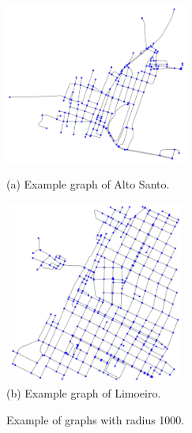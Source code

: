 \documentclass[a4paper,11pt]{article}
\begin{document}
\begin{figure}[!ht]
  \begin{minipage}[c]{.6\textwidth}
    \includegraphics[width=6cm, height=6cm]{graph-alto-santo.png} \\
    (a) Example graph of Alto Santo.
  \end{minipage}
  \begin{minipage}[c]{.6\textwidth}
    \includegraphics[width=6cm, height=6cm]{graph-limoeiro.png} \\
    (b) Example graph of Limoeiro.
  \end{minipage}
  \caption{\label{fig:graph-examples} Example of graphs with radius 1000.}
\end{figure}
\end{document}
